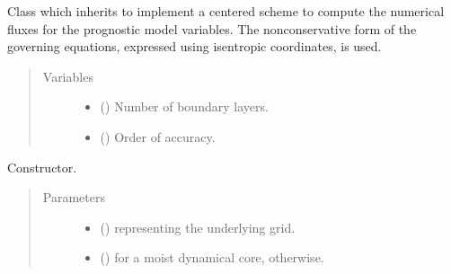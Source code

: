 \documentclass[letterpaper,10pt,english]{sphinxmanual}
\begin{document}
\begin{fulllineitems}
\label{\detokenize{api:dycore.flux_isentropic_nonconservative_centered.FluxIsentropicNonconservativeCentered}}
Class which inherits  to implement a
centered scheme to compute the numerical fluxes for the prognostic model variables.
The nonconservative form of the governing equations, expressed using isentropic coordinates, is used.
\begin{quote}\begin{description}
\item[{Variables}] \leavevmode\begin{itemize}
\item {} 
{\hyperref[\detokenize{api:dycore.prognostic_isentropic.PrognosticIsentropic.nb}]{}} () \textendash{} Number of boundary layers.

\item {} 
 () \textendash{} Order of accuracy.

\end{itemize}

\end{description}\end{quote}

\begin{fulllineitems}
\label{\detokenize{api:dycore.flux_isentropic_nonconservative_centered.FluxIsentropicNonconservativeCentered.__init__}}
Constructor.
\begin{quote}\begin{description}
\item[{Parameters}] \leavevmode\begin{itemize}
\item {} 
 () \textendash{}  representing the underlying grid.

\item {} 
 () \textendash{}  for a moist dynamical core,  otherwise.


\end{itemize}
\end{description}
\end{quote}
\end{fulllineitems}
\end{fulllineitems}
\end{document}

